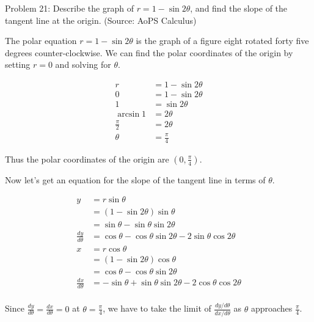Problem 21: Describe the graph of $r = 1 - \sin 2\theta$, and find the slope of the tangent line at the origin. (Source: AoPS Calculus)

The polar equation $r = 1 - \sin 2\theta$ is the graph of a figure eight rotated forty five degrees counter-clockwise. We can find the polar coordinates of the origin by setting $r = 0$ and solving for $\theta$.

\begin{align*}
r &= 1 - \sin 2\theta \\
0 &= 1 - \sin 2\theta \\
1 &= \sin 2\theta \\
\arcsin 1 &= 2 \theta \\
\frac{\pi}{2} &= 2 \theta \\
\theta &= \frac{\pi}{4}
\end{align*}

Thus the polar coordinates of the origin are $\left(0, \frac{\pi}{4}\right)$.

Now let's get an equation for the slope of the tangent line in terms of $\theta$. 

\begin{align*}
y &= r \sin \theta \\
&= (1 - \sin 2\theta) \sin \theta \\
&= \sin \theta - \sin \theta \sin 2\theta \\
\frac{dy}{d\theta} &= \cos \theta - \cos \theta \sin 2\theta - 2 \sin \theta \cos 2\theta \\
x &= r \cos \theta \\
&= (1 - \sin 2\theta) \cos \theta \\
&= \cos \theta - \cos \theta \sin 2\theta \\
\frac{dx}{d\theta} &= -\sin \theta + \sin \theta \sin 2\theta - 2 \cos \theta \cos 2\theta \\
\end{align*}

Since $\frac{dy}{d\theta} = \frac{dx}{d\theta} = 0$ at $\theta = \frac{\pi}{4}$, we have to take the limit of $\frac{dy/d\theta}{dx/d\theta}$ as $\theta$ approaches $\frac{\pi}{4}$.

